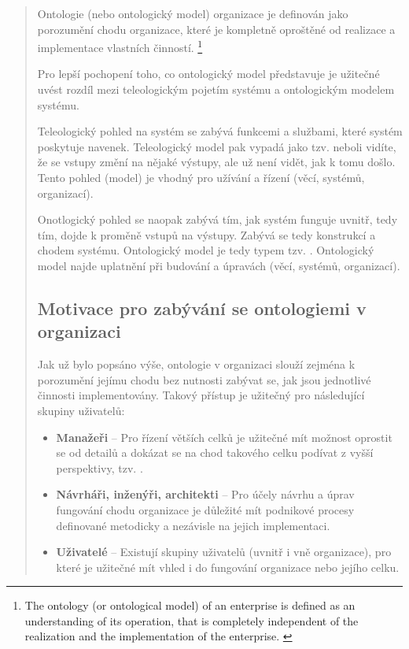 \documentclass[]{article}
\begin{document}
\begin{quote}
Ontologie (nebo ontologický model) organizace je definován jako porozumění chodu organizace, které je kompletně oproštěné od realizace a implementace vlastních činností.
\footnote{The ontology (or ontological model) of an enterprise is defined as an understanding of its operation, that is completely independent of the realization and the implementation of the enterprise. \cite{Dietz2005}}

Pro lepší pochopení toho, co ontologický model představuje je užitečné uvést rozdíl mezi teleologickým pojetím systému a ontologickým modelem systému.

Teleologický pohled na systém se zabývá funkcemi a službami, které systém poskytuje navenek. Teleologický model pak vypadá jako tzv.  neboli vidíte, že se vstupy změní na nějaké výstupy, ale už není vidět, jak k tomu došlo. Tento pohled (model) je vhodný pro užívání a řízení (věcí, systémů, organizací).

Onotlogický pohled se naopak zabývá tím, jak systém funguje uvnitř, tedy tím,  dojde k proměně vstupů na výstupy. Zabývá se tedy konstrukcí a chodem systému. Ontologický model je tedy typem tzv. . Ontologický model najde uplatnění při budování a úpravách (věcí, systémů, organizací).

\subsection{Motivace pro zabývání se ontologiemi v organizaci}
Jak už bylo popsáno výše, ontologie v organizaci slouží zejména k porozumění jejímu chodu bez nutnosti zabývat se, jak jsou jednotlivé činnosti implementovány. Takový přístup je užitečný pro následující skupiny uživatelů: \cite{Dietz2005}

\begin{itemize}
\item \textbf{Manažeři} – Pro řízení větších celků je užitečné mít možnost oprostit se od detailů a dokázat se na chod takového celku podívat z vyšší perspektivy, tzv. .
\item \textbf{Návrháři, inženýři, architekti} – Pro účely návrhu a úprav fungování chodu organizace je důležité mít podnikové procesy definované metodicky a nezávisle na jejich implementaci.
\item \textbf{Uživatelé} – Existují skupiny uživatelů (uvnitř i vně organizace), pro které je užitečné mít vhled i do fungování organizace nebo jejího celku.
\end{itemize}


\end{quote}
\end{document}
